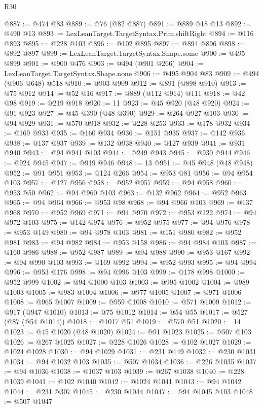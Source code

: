 \begin{lexlean}{R30}
\begin{coremodule}
@887 := @474 @83
@889 := @76 (@82 @887)
@891 := @889 @18 @13
@892 := @490 @13
@893 := LexLeanTarget.TargetSyntax.Prim.shiftRight
@894 := @116 @893
@895 := @228 @103
@896 := @102 @895
@897 := @894 @896
@898 := @892 @897
@899 := LexLeanTarget.TargetSyntax.Shape.some
@900 := @495 @899
@901 := @900 @476
@903 := @494 (@901 @266)
@904 := LexLeanTarget.TargetSyntax.Shape.none
@906 := @495 @904 @83
@909 := @494 (@906 @648) @518
@910 := @903 @909
@912 := @891 (@898 @910)
@913 := @75 @912
@914 := @52 @16
@917 := @889 (@112 @914) @111
@918 := @42 @98
@919 := @219 @918
@920 := 11
@923 := @45 @920 (@48 @920)
@924 := @91 @923
@927 := @45 @390 (@48 @390)
@929 := @264 @927 @103
@930 := @94 @929
@931 := @570 @918
@932 := @228 @253
@933 := @178 @932
@934 := @169 @933
@935 := @160 @934
@936 := @151 @935
@937 := @142 @936
@938 := @137 @937
@939 := @132 @938
@940 := @127 @939
@941 := @931 @940
@943 := @94 @941 @103
@944 := @249 @943
@945 := @930 @944
@946 := @924 @945
@947 := @919 @946
@948 := 13
@951 := @45 @948 (@48 @948)
@952 := @91 @951
@953 := @124 @266
@954 := @953 @81
@956 := @94 @954 @103
@957 := @127 @956
@958 := @952 @957
@959 := @94 @958
@960 := @953 @50
@962 := @94 @960 @103
@963 := @132 @962
@964 := @952 @963
@965 := @94 @964
@966 := @953 @98
@968 := @94 @966 @103
@969 := @137 @968
@970 := @952 @969
@971 := @94 @970
@972 := @953 @122
@974 := @94 @972 @103
@975 := @142 @974
@976 := @952 @975
@977 := @94 @976
@978 := @953 @149
@980 := @94 @978 @103
@981 := @151 @980
@982 := @952 @981
@983 := @94 @982
@984 := @953 @158
@986 := @94 @984 @103
@987 := @160 @986
@988 := @952 @987
@989 := @94 @988
@990 := @953 @167
@992 := @94 @990 @103
@993 := @169 @992
@994 := @952 @993
@995 := @94 @994
@996 := @953 @176
@998 := @94 @996 @103
@999 := @178 @998
@1000 := @952 @999
@1002 := @94 @1000 @103
@1003 := @995 @1002
@1004 := @989 @1003
@1005 := @983 @1004
@1006 := @977 @1005
@1007 := @971 @1006
@1008 := @965 @1007
@1009 := @959 @1008
@1010 := @571 @1009
@1012 := @917 (@947 @1010)
@1013 := @75 @1012
@1014 := @54 @55
@1017 := @527 (@87 (@54 @1014))
@1018 := @1017 @51
@1019 := @570 @51
@1020 := 14
@1023 := @45 @1020 (@48 @1020)
@1024 := @91 @1023
@1025 := @507 @103
@1026 := @267 @1025
@1027 := @228 @1026
@1028 := @102 @1027
@1029 := @1024 @1028
@1030 := @94 @1029
@1031 := @231 @149
@1032 := @230 @1031
@1034 := @94 @1032 @103
@1035 := @507 @1034
@1036 := @226 @1035
@1037 := @94 @1036
@1038 := @1037 @103
@1039 := @267 @1038
@1040 := @228 @1039
@1041 := @102 @1040
@1042 := @1024 @1041
@1043 := @94 @1042
@1044 := @231 @307
@1045 := @230 @1044
@1047 := @94 @1045 @103
@1048 := @507 @1047

\end{coremodule}
\end{lexlean}
